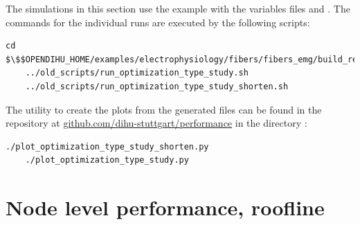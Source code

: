 
\begin{reproduce}
  The simulations in this section use the example 
   with the variables files  and .
  The commands for the individual runs are executed by the following scripts:
  \begin{lstlisting}[columns=fullflexible,breaklines=true,postbreak=\mbox{\textcolor{gray}{$\hookrightarrow$}\space}]
    cd $\$$OPENDIHU_HOME/examples/electrophysiology/fibers/fibers_emg/build_release
    ../old_scripts/run_optimization_type_study.sh
    ../old_scripts/run_optimization_type_study_shorten.sh
  \end{lstlisting}
  The utility to create the plots from the generated  files can be found in the repository at \href{https://github.com/dihu-stuttgart/performance}{github.com/dihu-stuttgart/performance}
  in the directory :
  \begin{lstlisting}[columns=fullflexible,breaklines=true,postbreak=\mbox{\textcolor{gray}{$\hookrightarrow$}\space}]
    ./plot_optimization_type_study_shorten.py
    ./plot_optimization_type_study.py
  \end{lstlisting}
\end{reproduce}

\section{Node level performance, roofline}

